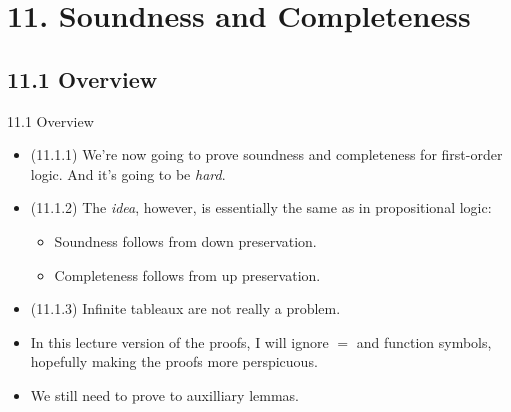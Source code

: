 \documentclass[../slides.tex]{subfiles}
\begin{document}
\section{11. Soundness and Completeness}
\subsection{11.1 Overview}

\begin{frame}{11.1 Overview}

	\begin{itemize}
		
        \item (11.1.1) We're now going to prove soundness and
          completeness for first-order logic. And it's going to be
          \emph{hard}.

          \item (11.1.2) The \emph{idea}, however, is essentially the
            same as in propositional logic:
            \begin{itemize}

            \item Soundness follows from down preservation.

            \item Completeness follows from up preservation.

            \end{itemize}

          \item (11.1.3) Infinite tableaux are not really a problem.

           \item In this lecture version of the proofs, I will ignore
             $=$ and function symbols, hopefully making the proofs
             more perspicuous.

            \item We still need to prove to auxilliary lemmas.
          
	\end{itemize}

\end{frame}
\end{document}
